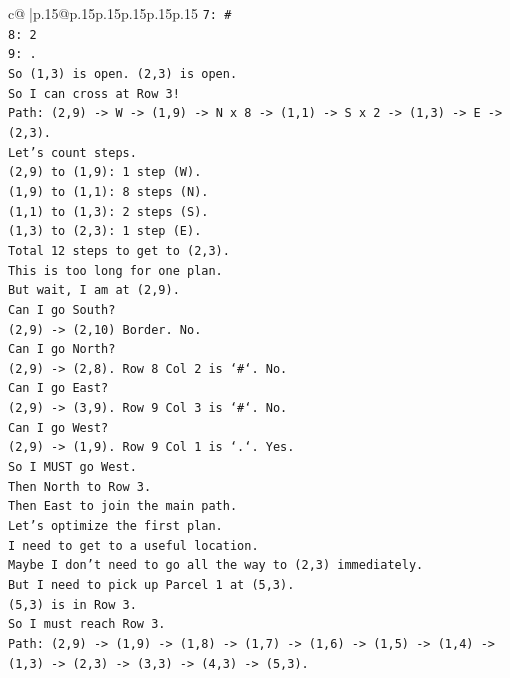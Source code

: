 \documentclass{article}
\begin{document}
{\begin{supertabular}{c@{$\;$}|p{.15\linewidth}@{}p{.15\linewidth}p{.15\linewidth}p{.15\linewidth}p{.15\linewidth}p{.15\linewidth}}
{{{\texttt{7: \#} \\
\texttt{8: 2} \\
\texttt{9: .} \\
\texttt{So (1,3) is open. (2,3) is open.} \\
\texttt{So I can cross at Row 3!} \\
\texttt{Path: (2,9) {-}> W {-}> (1,9) {-}> N x 8 {-}> (1,1) {-}> S x 2 {-}> (1,3) {-}> E {-}> (2,3).} \\
\texttt{Let's count steps.} \\
\texttt{(2,9) to (1,9): 1 step (W).} \\
\texttt{(1,9) to (1,1): 8 steps (N).} \\
\texttt{(1,1) to (1,3): 2 steps (S).} \\
\texttt{(1,3) to (2,3): 1 step (E).} \\
\texttt{Total 12 steps to get to (2,3).} \\
\texttt{This is too long for one plan.} \\
\texttt{But wait, I am at (2,9).} \\
\texttt{Can I go South?} \\
\texttt{(2,9) {-}> (2,10) Border. No.} \\
\texttt{Can I go North?} \\
\texttt{(2,9) {-}> (2,8). Row 8 Col 2 is `\#`. No.} \\
\texttt{Can I go East?} \\
\texttt{(2,9) {-}> (3,9). Row 9 Col 3 is `\#`. No.} \\
\texttt{Can I go West?} \\
\texttt{(2,9) {-}> (1,9). Row 9 Col 1 is `.`. Yes.} \\
\texttt{So I MUST go West.} \\
\texttt{Then North to Row 3.} \\
\texttt{Then East to join the main path.} \\
\texttt{Let's optimize the first plan.} \\
\texttt{I need to get to a useful location.} \\
\texttt{Maybe I don't need to go all the way to (2,3) immediately.} \\
\texttt{But I need to pick up Parcel 1 at (5,3).} \\
\texttt{(5,3) is in Row 3.} \\
\texttt{So I must reach Row 3.} \\
\texttt{Path: (2,9) {-}> (1,9) {-}> (1,8) {-}> (1,7) {-}> (1,6) {-}> (1,5) {-}> (1,4) {-}> (1,3) {-}> (2,3) {-}> (3,3) {-}> (4,3) {-}> (5,3).} \\
}}}
\end{supertabular}}
\end{document}
